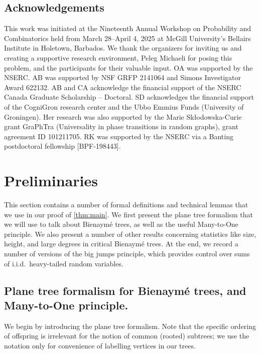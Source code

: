 \documentclass[11pt,reqno]{amsart}
\begin{document}
\subsection*{Acknowledgements}
This work was initiated at the  Nineteenth Annual Workshop on Probability and Combinatorics held from March 28--April 4, 2025 at McGill University's Bellairs Institute in Holetown, Barbados. We thank the organizers for inviting us and creating a supportive research environment, Peleg Michaeli for posing this problem, and the participants for their valuable input. OA was supported by the NSERC. %
AB was supported by NSF GRFP 2141064 and Simons Investigator Award 622132. AB and CA acknowledge the financial support of the NSERC Canada Graduate Scholarship -- Doctoral. SD acknowledges the financial support of the CogniGron research center and the Ubbo Emmius Funds (University of Groningen). Her research was also supported by
the Marie Skłodowska-Curie grant GraPhTra (Universality in phase transitions in random
graphs), grant agreement ID 101211705. RK was supported by the NSERC via a Banting postdoctoral fellowship [BPF-198443].

\section{Preliminaries}
\label{sec:preliminaries}

This section contains a number of formal definitions and technical lemmas that we use in our proof of \cref{thm:main}. We first present the plane tree formalism that we will use to talk about Bienaym\'{e} trees, as well as the useful Many-to-One principle. We also present a number of other results concerning statistics like size, height, and large degrees in critical Bienaym\'{e} trees. At the end, we record a number of versions of the big jumps principle, which provides control over sums of i.i.d.~heavy-tailed random variables.

\subsection{Plane tree formalism for Bienaymé trees, and Many-to-One principle.}

We begin by introducing the plane tree formalism. Note that the specific ordering of offspring is irrelevant for the notion of common (rooted) subtrees; we use the notation only for convenience of labelling vertices in our trees.
\end{document}

